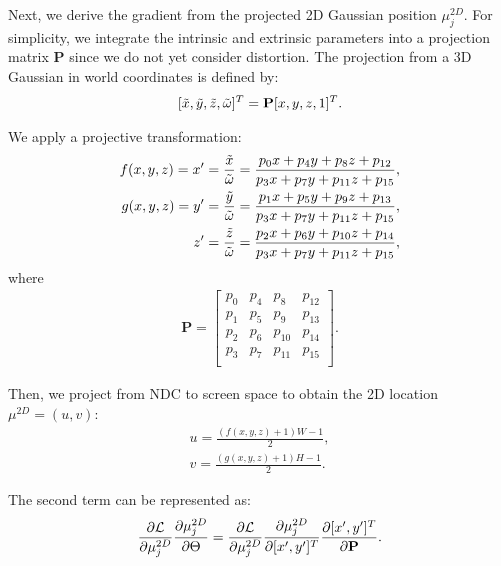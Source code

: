 Next, we derive the gradient from the projected 2D Gaussian position $\mu_j^{2D}$. For simplicity, we integrate the intrinsic and extrinsic parameters into a projection matrix $\textbf{P}$ since we do not yet consider distortion. The projection from a 3D Gaussian in world coordinates is defined by:
\begin{align}
    \relax[\Tilde{x}, \Tilde{y}, \Tilde{z}, \Tilde{\omega}]^T=\textbf{P}[x,y,z,1]^T.
\end{align}

We apply a projective transformation:
\begin{equation}
\begin{aligned}
    f(x,y,z)=x'=\frac{\Tilde{x}}{\Tilde{\omega}}=\frac{p_0x+p_4y+p_8z+p_{12}}{p_3x+p_7y+p_{11}z+p_{15}}, \\ 
    g(x,y,z)=y'=\frac{\Tilde{y}}{\Tilde{\omega}}=\frac{p_1x+p_5y+p_9z+p_{13}}{p_3x+p_7y+p_{11}z+p_{15}},\\
    z'=\frac{\Tilde{z}}{\Tilde{\omega}}=\frac{p_2x+p_6y+p_{10}z+p_{14}}{p_3x+p_7y+p_{11}z+p_{15}},
\end{aligned}
\end{equation}
where
\begin{align}
    \textbf{P}=\begin{bmatrix}
    p_0 & p_4 & p_8 & p_{12} \\
    p_1 & p_5 & p_9 & p_{13} \\
    p_2 & p_6 & p_{10} & p_{14} \\
    p_3 & p_7 & p_{11} & p_{15} \\
    \end{bmatrix}.
\end{align}

Then, we project from NDC to screen space to obtain the 2D location $\mu^{2D}=(u, v)$:
\begin{align}
    u=\frac{(f(x,y,z)+1)W-1}{2},\\
    v=\frac{(g(x,y,z)+1)H-1}{2}.
\end{align}

The second term can be represented as:
\begin{align}
    \frac{\partial \mathcal{L}}{\partial \mu^{2D}_j}\frac{\partial \mu^{2D}_j}{\partial \Theta}=\frac{\partial \mathcal{L}}{\partial \mu^{2D}_j}\frac{\partial \mu^{2D}_j}{\partial [x', y']^T}\frac{\partial [x', y']^T}{\partial \textbf{P}}.
\end{align}

